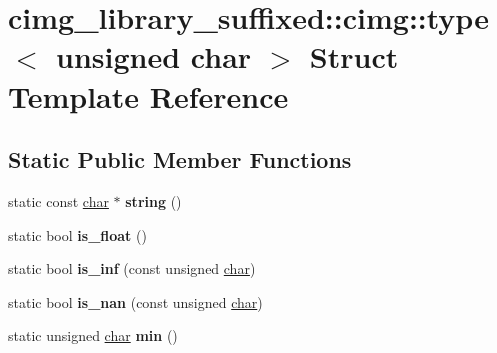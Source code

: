 \hypertarget{structcimg__library__suffixed_1_1cimg_1_1type_3_01unsigned_01char_01_4}{}\section{cimg\+\_\+library\+\_\+suffixed\+:\+:cimg\+:\+:type$<$ unsigned char $>$ Struct Template Reference}
\label{structcimg__library__suffixed_1_1cimg_1_1type_3_01unsigned_01char_01_4}
\subsection*{Static Public Member Functions}
\begin{DoxyCompactItemize}
\item 
\mbox{\label{structcimg__library__suffixed_1_1cimg_1_1type_3_01unsigned_01char_01_4_a4a94a1a0fa653f94f275fbb515e0fa75}} 
static const \hyperlink{classchar}{char} $\ast$ {\bfseries string} ()
\item 
\mbox{\label{structcimg__library__suffixed_1_1cimg_1_1type_3_01unsigned_01char_01_4_a7b623df68dc636a5454c473c671daf76}} 
static bool {\bfseries is\+\_\+float} ()
\item 
\mbox{\label{structcimg__library__suffixed_1_1cimg_1_1type_3_01unsigned_01char_01_4_ad6b28310d2a070e0ecc28c8b0d7b56a9}} 
static bool {\bfseries is\+\_\+inf} (const unsigned \hyperlink{classchar}{char})
\item 
\mbox{\label{structcimg__library__suffixed_1_1cimg_1_1type_3_01unsigned_01char_01_4_a30742206c6ce31244c6d2bfb1a25774e}} 
static bool {\bfseries is\+\_\+nan} (const unsigned \hyperlink{classchar}{char})
\item 
\mbox{\label{structcimg__library__suffixed_1_1cimg_1_1type_3_01unsigned_01char_01_4_a1fdcb81e3d5e127de6b1f4e24fedd688}} 
static unsigned \hyperlink{classchar}{char} {\bfseries min} ()

\end{DoxyCompactItemize}
